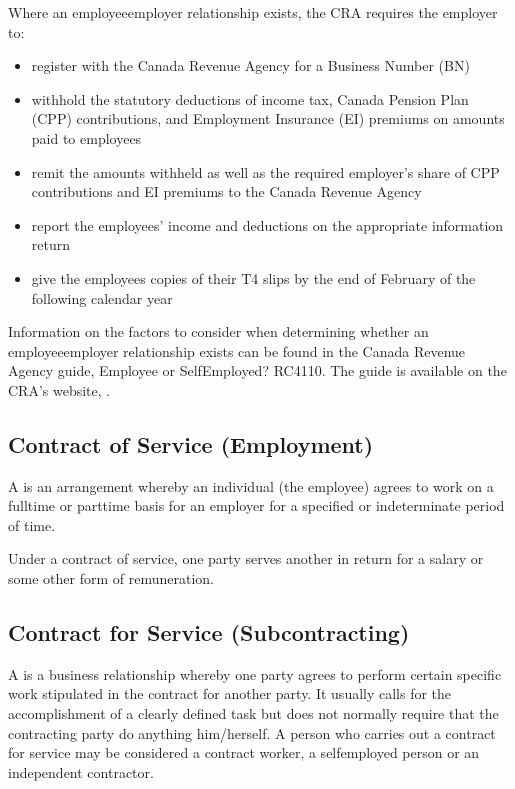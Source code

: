 \documentclass[letterpaper,10pt,english]{sphinxmanual}
\begin{document}
\sphinxAtStartPar
Where an employee\sphinxhyphen{}employer relationship exists, the CRA requires the employer to:
\begin{itemize}
\item {} 
\sphinxAtStartPar
register with the Canada Revenue Agency for a Business Number (BN)

\item {} 
\sphinxAtStartPar
withhold the statutory deductions of income tax, Canada Pension Plan (CPP) contributions, and Employment Insurance (EI) premiums on amounts paid to employees

\item {} 
\sphinxAtStartPar
remit the amounts withheld as well as the required employer’s share of CPP contributions and EI premiums to the Canada Revenue Agency

\item {} 
\sphinxAtStartPar
report the employees’ income and deductions on the appropriate information return

\item {} 
\sphinxAtStartPar
give the employees copies of their T4 slips by the end of February of the following calendar year

\end{itemize}

\sphinxAtStartPar
Information on the factors to consider when determining whether an employee\sphinxhyphen{}employer relationship exists can be found in the
Canada Revenue Agency guide, Employee or Self\sphinxhyphen{}Employed? \sphinxhyphen{} RC4110. The guide is available on the CRA’s website,
.


\subsection{Contract of Service (Employment)}
\label{\detokenize{3_contracts:contract-of-service-employment}}
\sphinxAtStartPar
A  is an arrangement whereby an individual (the employee) agrees to
work on a full\sphinxhyphen{}time or part\sphinxhyphen{}time basis for an employer for a specified or indeterminate period
of time.

\sphinxAtStartPar
Under a contract of service, one party serves another in return for a salary or some other form
of remuneration.


\subsection{Contract for Service (Subcontracting)}
\label{\detokenize{3_contracts:contract-for-service-subcontracting}}
\sphinxAtStartPar
A  is a business relationship whereby one party agrees to perform certain
specific work stipulated in the contract for another party. It usually calls for the
accomplishment of a clearly defined task but does not normally require that the contracting
party do anything him/herself. A person who carries out a contract for service may be
considered a contract worker, a self\sphinxhyphen{}employed person or an independent contractor.
\end{document}
